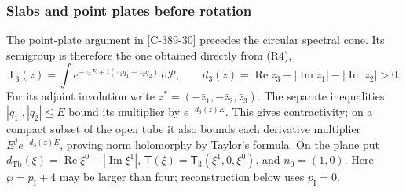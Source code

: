 \documentclass[11pt,letterpaper,reqno]{amsart}
\theoremstyle{definition}
\theoremstyle{remark}
\begin{document}
\subsubsection{Slabs and point plates before rotation}

The point-plate argument in \cref{C-389-30} precedes the
circular spectral cone. Its semigroup is therefore the
one obtained directly from (R4),
\[
 \mathsf T_3(z)=\int e^{-z_3E+i(z_1q_1+z_2q_2)}\,\mathrm{d}\mathcal P,
 \qquad d_3(z)=\operatorname{Re}z_3-|\operatorname{Im}z_1|
                                      -|\operatorname{Im}z_2|>0.
\]
For its adjoint involution write
$z^*=(-\bar z_1,-\bar z_2,\bar z_3)$.
The separate inequalities $|q_1|,|q_2|\le E$ bound its
multiplier by $e^{-d_3(z)E}$. This gives contractivity;
on a compact subset of the open tube it also bounds each
derivative multiplier $E^j e^{-d_3(z)E}$, proving norm
holomorphy by Taylor's formula. On the plane put
$d_{\mathrm{Tb}}(\xi)=\operatorname{Re}\xi^0-|\operatorname{Im}\xi^1|$,
$\mathsf T(\xi)=\mathsf T_3(\xi^1,0,\xi^0)$, and
$n_0=(1,0)$. Here $\wp=p_{\mathrm I}+4$ may be larger
than four; reconstruction below uses $p_{\mathrm I}=0$.
\end{document}
